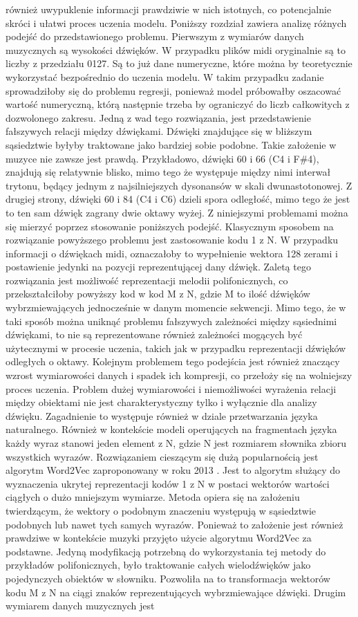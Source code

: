 również uwypuklenie informacji prawdziwie w nich istotnych, co potencjalnie skróci i ułatwi proces uczenia modelu. Poniższy rozdział zawiera analizę różnych podejść do przedstawionego problemu. Pierwszym z wymiarów danych muzycznych są wysokości dźwięków. W przypadku plików midi oryginalnie są to liczby z przedziału 0127. Są to już dane numeryczne, które można by teoretycznie wykorzystać bezpośrednio do uczenia modelu. W takim przypadku zadanie sprowadziłoby się do problemu regresji, ponieważ model próbowałby oszacować wartość numeryczną, którą następnie trzeba by ograniczyć do liczb całkowitych z dozwolonego zakresu. Jedną z wad tego rozwiązania, jest przedstawienie fałszywych relacji między dźwiękami. Dźwięki znajdujące się w bliższym sąsiedztwie byłyby traktowane jako bardziej sobie podobne. Takie założenie w muzyce nie zawsze jest prawdą. Przykładowo, dźwięki 60 i 66 (C4 i F\#4), znajdują się relatywnie blisko, mimo tego że występuje między nimi interwał trytonu, będący jednym z najsilniejszych dysonansów w skali  dwunastotonowej. Z drugiej strony, dźwięki 60 i 84 (C4 i C6) dzieli spora odległość, mimo tego że jest to ten sam dźwięk zagrany dwie oktawy wyżej. Z niniejszymi problemami można się mierzyć poprzez stosowanie poniższych podejść. Klasycznym sposobem na rozwiązanie powyższego problemu jest zastosowanie kodu  1\,\,z\,\,N. W przypadku informacji o dźwiękach midi, oznaczałoby to wypełnienie wektora 128 zerami i postawienie jedynki na  pozycji reprezentującej dany dźwięk.  Zaletą tego rozwiązania jest możliwość reprezentacji melodii polifonicznych, co przekształciłoby powyższy kod w kod  M\,\,z\,\,N, gdzie M to ilość dźwięków wybrzmiewających jednocześnie w danym momencie sekwencji. Mimo tego, że w taki sposób można uniknąć problemu fałszywych zależności między sąsiednimi dźwiękami,  to nie są reprezentowane również zależności mogących być użytecznymi w procesie uczenia,  takich jak w przypadku reprezentacji dźwięków odległych o oktawy.  Kolejnym problemem tego podejścia jest również znaczący wzrost wymiarowości danych i spadek ich kompresji, co przełoży się na wolniejszy proces uczenia. Problem dużej wymiarowości i niemożliwości wyrażenia relacji między obiektami nie jest charakterystyczny tylko i wyłącznie dla analizy dźwięku. Zagadnienie to  występuje również w dziale przetwarzania języka naturalnego. Również w kontekście modeli operujących na fragmentach języka każdy wyraz stanowi jeden element z N, gdzie N jest rozmiarem słownika  zbioru wszystkich wyrazów. Rozwiązaniem cieszącym się dużą popularnością jest algorytm Word2Vec zaproponowany w roku 2013 . Jest to algorytm służący do wyznaczenia ukrytej reprezentacji kodów  1\,\,z\,\,N w postaci wektorów wartości ciągłych o dużo mniejszym wymiarze. Metoda opiera się na założeniu twierdzącym, że wektory  o podobnym znaczeniu występują w sąsiedztwie podobnych lub nawet tych samych wyrazów. Ponieważ to założenie  jest również prawdziwe w kontekście muzyki przyjęto użycie algorytmu Word2Vec za podstawne. Jedyną modyfikacją potrzebną do wykorzystania tej metody do przykładów polifonicznych, było traktowanie  całych wielodźwięków jako pojedynczych obiektów w słowniku. Pozwoliła na to transformacja wektorów kodu   M\,\,z\,\,N na ciągi znaków reprezentujących wybrzmiewające dźwięki. Drugim wymiarem danych muzycznych jest 